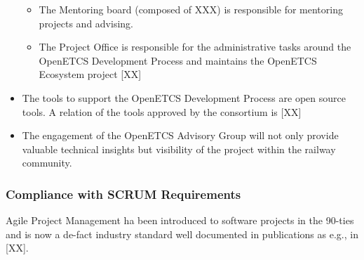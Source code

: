 \documentclass{template/openetcs_article}
\begin{document}
\begin{itemize}
\begin{itemize}
\item The Mentoring board (composed of XXX) is responsible for mentoring projects and advising.
\item The Project Office is responsible for the administrative tasks around the OpenETCS Development Process and maintains the OpenETCS Ecosystem project [XX]
\end{itemize}
\item The tools to support the OpenETCS Development Process are open source tools. A relation of the tools approved by the consortium is [XX]
\item The engagement of the OpenETCS Advisory Group will not only provide valuable technical insights but visibility of the project within the railway community.
\end{itemize}

\subsubsection{Compliance with SCRUM Requirements}
Agile Project Management ha been introduced to software projects in the 90-ties and is now a de-fact industry standard well documented in publications as e.g., in [XX].
\end{document}
